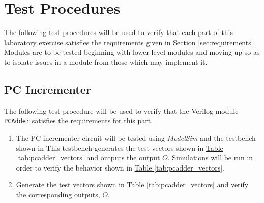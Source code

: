 \section{Test Procedures} %
\label{sec:test_procedures}

The following test procedures will be used to verify that each part of this laboratory exercise satisfies the requirements given in \hyperref[sec:requirements]{Section \ref*{sec:requirements}}.
Modules are to be tested beginning with lower-level modules and moving up so as to isolate issues in a module from those which may implement it.

\subsection{PC Incrementer} %
\label{sub:pc_incrementer}

The following test procedure will be used to verify that the Verilog module \verb|PCAdder| satisfies the requirements for this part.

\begin{enumerate}
    \item The PC incrementer circuit will be tested using \emph{ModelSim} and the testbench shown in %
    This testbench generates the test vectors shown in \hyperref[tab:pcadder_vectors]{Table \ref*{tab:pcadder_vectors}} and outputs the output $O$.
    Simulations will be run in order to verify the behavior shown in \hyperref[tab:pcadder_vectors]{Table \ref*{tab:pcadder_vectors}}.
    \item Generate the test vectors shown in \hyperref[tab:pcadder_vectors]{Table \ref*{tab:pcadder_vectors}} and verify the corresponding outputs, $O$.
\end{enumerate}

